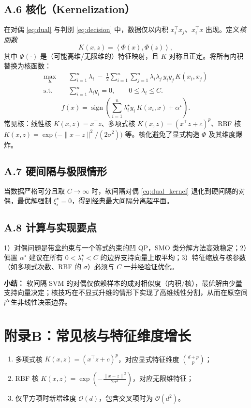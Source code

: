 \documentclass[10.5pt,hyperref,a4paper,UTF8]{ctexart}
\newcommand{\norm}[1]{\left\lVert #1\right\rVert}
\newcommand{\inner}[2]{\left\langle #1,#2\right\rangle}
\theoremstyle{definition}
\begin{document}
\subsection*{A.6 核化（Kernelization）}
在对偶 \eqref{eq:dual} 与判别 \eqref{eq:decision} 中，数据仅以内积 $x_i^\top x_j$、$x_i^\top x$ 出现。定义\emph{核函数}
\[
K(x,z) = \inner{\Phi(x)}{\Phi(z)},
\]
其中 $\Phi(\cdot)$ 是（可能高维/无限维的）特征映射，且 $K$ 对称且正定。将所有内积替换为核函数：
\begin{equation}\label{eq:dual_kernel}
\begin{aligned}
\max_{\bm\lambda}\quad & 
\sum_{i=1}^n \lambda_i \ -\ \frac{1}{2}\sum_{i=1}^n\sum_{j=1}^n 
\lambda_i \lambda_j\, y_i y_j\, K(x_i,x_j)\\
\text{s.t.}\quad &
\sum_{i=1}^n \lambda_i y_i = 0,\qquad 0\le \lambda_i \le C.
\end{aligned}
\end{equation}
\begin{equation}\label{eq:decision_kernel}
f(x) = \operatorname{sign}\!\left(\sum_{i=1}^n \lambda_i^\star y_i\, K(x_i,x) + \alpha^\star\right).
\end{equation}
常见核：线性核 $K(x,z)=x^\top z$、多项式核 $K(x,z)=(x^\top z+c)^p$、RBF 核 $K(x,z)=\exp\!\bigl(-\|x-z\|^2/(2\sigma^2)\bigr)$ 等。核化避免了显式构造 $\Phi$ 及其维度爆炸。

\subsection*{A.7 硬间隔与极限情形}
当数据严格可分且取 $C\to\infty$ 时，软间隔对偶 \eqref{eq:dual_kernel} 退化到硬间隔的对偶，最优解强制 $\xi_i^\star=0$，得到经典最大间隔分离超平面。

\subsection*{A.8 计算与实现要点}
1）对偶问题是带盒约束与一个等式约束的凹 QP，SMO 类分解方法高效稳定；2）偏置 $\alpha^\star$ 建议在所有 $0<\lambda_i^\star<C$ 的边界支持向量上取平均；3）特征缩放与核参数（如多项式次数、RBF 的 $\sigma$）必须与 $C$ 一并经验证优化。

\bigskip
\noindent\textbf{小结：}
软间隔 SVM 的对偶仅依赖样本的成对相似度（内积/核），最优解由少量支持向量决定；核技巧在不显式升维的情形下实现了高维线性分割，从而在原空间产生非线性决策边界。


\section*{附录B：常见核与特征维度增长}
\begin{enumerate}
  \item 多项式核 $K(x,z)=(x^\top z+c)^p$，对应显式特征维度 $\binom{d+p}{p}$；
  \item RBF 核 $K(x,z)=\exp(-\tfrac{\norm{x-z}^2}{2\sigma^2})$，对应无限维特征；
  \item 仅平方项时新增维度 $\mathcal{O}(d)$，包含交叉项时为 $\mathcal{O}(d^2)$。
\end{enumerate}




\newpage
{}
\end{document}
